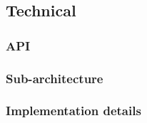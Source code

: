 \subsection{Technical}
\subsubsection{API}
\subsubsection{Sub-architecture}
\subsubsection{Implementation details}
